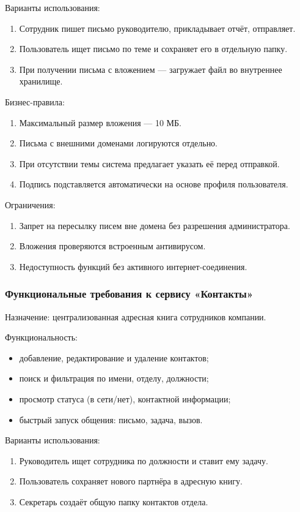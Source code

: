 Варианты использования:
\begin{enumerate}
  \item Сотрудник пишет письмо руководителю, прикладывает отчёт, отправляет.
  \item Пользователь ищет письмо по теме и сохраняет его в отдельную папку.
  \item При получении письма с вложением — загружает файл во внутреннее хранилище.
\end{enumerate}

Бизнес-правила:
\begin{enumerate}
  \item Максимальный размер вложения — 10 МБ.
  \item Письма с внешними доменами логируются отдельно.
  \item При отсутствии темы система предлагает указать её перед отправкой.
  \item Подпись подставляется автоматически на основе профиля пользователя.
\end{enumerate}

Ограничения:
\begin{enumerate}
  \item Запрет на пересылку писем вне домена без разрешения администратора.
  \item Вложения проверяются встроенным антивирусом.
  \item Недоступность функций без активного интернет-соединения.
\end{enumerate}

\subsubsection{Функциональные требования к сервису «Контакты»}

Назначение: централизованная адресная книга сотрудников компании.

Функциональность:
\begin{itemize}
  \item добавление, редактирование и удаление контактов;
  \item поиск и фильтрация по имени, отделу, должности;
  \item просмотр статуса (в сети/нет), контактной информации;
  \item быстрый запуск общения: письмо, задача, вызов.
\end{itemize}

Варианты использования:
\begin{enumerate}
  \item Руководитель ищет сотрудника по должности и ставит ему задачу.
  \item Пользователь сохраняет нового партнёра в адресную книгу.
  \item Секретарь создаёт общую папку контактов отдела.
\end{enumerate}

